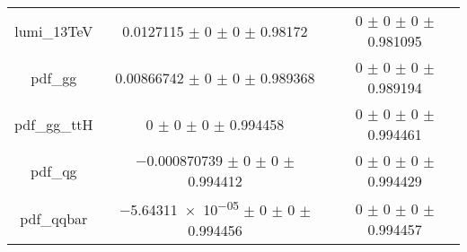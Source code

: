 \begin{table}
\begin{tabular}{ccc}
lumi\_13TeV & \num{0.0127115} $\pm$ \num{0} $\pm$ \num{0} $\pm$ \num{0.98172} & \num{0} $\pm$ \num{0} $\pm$ \num{0} $\pm$ \num{0.981095}\\
pdf\_gg & \num{0.00866742} $\pm$ \num{0} $\pm$ \num{0} $\pm$ \num{0.989368} & \num{0} $\pm$ \num{0} $\pm$ \num{0} $\pm$ \num{0.989194}\\
pdf\_gg\_ttH & \num{0} $\pm$ \num{0} $\pm$ \num{0} $\pm$ \num{0.994458} & \num{0} $\pm$ \num{0} $\pm$ \num{0} $\pm$ \num{0.994461}\\
pdf\_qg & \num{-0.000870739} $\pm$ \num{0} $\pm$ \num{0} $\pm$ \num{0.994412} & \num{0} $\pm$ \num{0} $\pm$ \num{0} $\pm$ \num{0.994429}\\
pdf\_qqbar & \num{-5.64311e-05} $\pm$ \num{0} $\pm$ \num{0} $\pm$ \num{0.994456} & \num{0} $\pm$ \num{0} $\pm$ \num{0} $\pm$ \num{0.994457}\\
\bottomrule
\end{tabular}
\end{table}